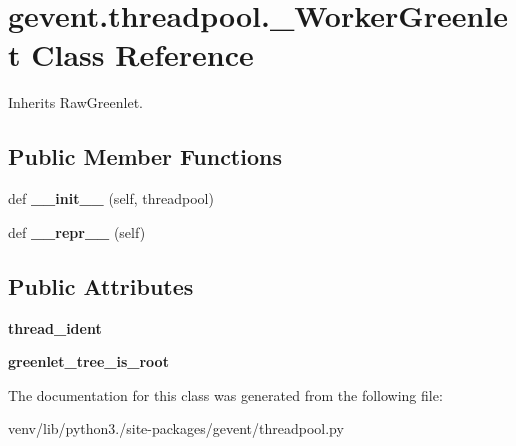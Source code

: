 \hypertarget{classgevent_1_1threadpool_1_1___worker_greenlet}{}\section{gevent.\+threadpool.\+\_\+\+Worker\+Greenlet Class Reference}
\label{classgevent_1_1threadpool_1_1___worker_greenlet}


Inherits Raw\+Greenlet.

\subsection*{Public Member Functions}
\begin{DoxyCompactItemize}
\item 
\mbox{\label{classgevent_1_1threadpool_1_1___worker_greenlet_a6fcc110e786e953ca9ee88ebde81085f}} 
def {\bfseries \+\_\+\+\_\+init\+\_\+\+\_\+} (self, threadpool)
\item 
\mbox{\label{classgevent_1_1threadpool_1_1___worker_greenlet_a6187faa6abddea1f5a2aa60c142fa799}} 
def {\bfseries \+\_\+\+\_\+repr\+\_\+\+\_\+} (self)
\end{DoxyCompactItemize}
\subsection*{Public Attributes}
\begin{DoxyCompactItemize}
\item 
\mbox{\label{classgevent_1_1threadpool_1_1___worker_greenlet_ae60c3dca3db87f7dffbeca073187f749}} 
{\bfseries thread\+\_\+ident}
\item 
\mbox{\label{classgevent_1_1threadpool_1_1___worker_greenlet_ac7ed6c0cb0d15d5dc1a9ca5694197e2c}} 
{\bfseries greenlet\+\_\+tree\+\_\+is\+\_\+root}
\end{DoxyCompactItemize}


The documentation for this class was generated from the following file\+:\begin{DoxyCompactItemize}
\item 
venv/lib/python3./site-\/packages/gevent/threadpool.\+py\end{DoxyCompactItemize}
